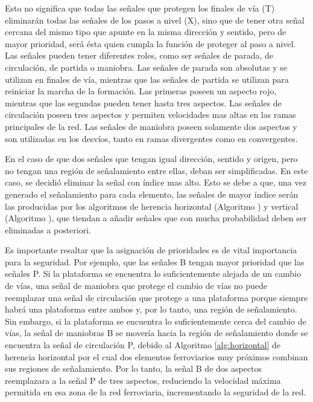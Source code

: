 	Esto no significa que todas las señales que protegen los finales de vía (T) eliminarán todas las señales de los pasos a nivel (X), sino que de tener otra señal cercana del mismo tipo que apunte en la misma dirección y sentido, pero de mayor prioridad, será ésta quien cumpla la función de proteger al paso a nivel. Las señales pueden tener diferentes roles, como ser señales de parada, de circulación, de partida o maniobra. Las señales de parada son absolutas y se utilizan en finales de vía, mientras que las señales de partida se utilizan para reiniciar la marcha de la formación. Las primeras poseen un aspecto rojo, mientras que las segundas pueden tener hasta tres aspectos. Las señales de circulación poseen tres aspectos y permiten velocidades mas altas en las ramas principales de la red. Las señales de maniobra poseen solamente dos aspectos y son utilizadas en los desvíos, tanto en ramas divergentes como en convergentes.
	
	En el caso de que dos señales que tengan igual dirección, sentido y origen, pero no tengan una región de señalamiento entre ellas, deban ser simplificadas. En este caso, se decidió eliminar la señal con índice mas alto. Esto se debe a que, una vez generado el señalamiento para cada elemento, las señales de mayor índice serán las producidas por los algoritmos de herencia horizontal (Algoritmo \label{alg:horizontal}) y vertical (Algoritmo \label{alg:vertical}), que tiendan a añadir señales que con mucha probabilidad deben ser eliminadas a posteriori.
	
    Es importante resaltar que la asignación de prioridades es de vital importancia para la seguridad. Por ejemplo, que las señales B tengan mayor prioridad que las señales P. Si la plataforma se encuentra lo suficientemente alejada de un cambio de vías, una señal de maniobra que protege el cambio de vías no puede reemplazar una señal de circulación que protege a una plataforma porque siempre habrá una plataforma entre ambos y, por lo tanto, una región de señalamiento. Sin embargo, si la plataforma se encuentra lo suficientemente cerca del cambio de vías, la señal de maniobras B se movería hacia la región de señalamiento donde se encuentra la señal de circulación P, debido al Algoritmo \ref{alg:horizontal} de herencia horizontal por el cual dos elementos ferroviarios muy próximos combinan sus regiones de señalamiento. Por lo tanto, la señal B de dos aspectos reemplazara a la señal P de tres aspectos, reduciendo la velocidad máxima permitida en esa zona de la red ferroviaria, incrementando la seguridad de la red.	